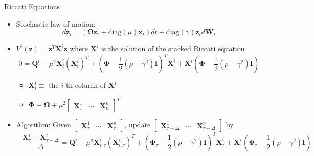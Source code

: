 \documentclass[
  10pt,               %
  aspectratio=169,     %
]{beamer}
\theoremstyle{plain}
\begin{document}
\begin{frame}{Riccati Equations}
  \begin{itemize}
    \item  Stochastic law of motion:
          \[d\bm{z}_{t}=\left(\bm{\Omega}\bm{z}_{t}+\mathrm{diag}\left(\mu\right)\bm{x}_{t}\right)dt+\mathrm{diag}\left(\gamma\right)\bm{z}_{t} d\bm{W}_{t}\]
    \item  \label{riccati} $V^{i}\left(\bm{z}\right)=\bm{z}^{T}\bm{X}^{i}\bm{z}$ where
          $\bm{X}^{i}$ is the solution of the stacked Riccati equation
            {\small
              \[
                0=\bm{Q}^{i}-\mu^{2}\bm{X}_{i}^{i}\left(\bm{X}_{i}^{i}\right)^{T}+\left(\bm{\Phi}-\frac{1}{2}\left(\rho-\gamma^{2}\right)\bm{I}\right)^{T}\bm{X}^{i}+\bm{X}^{i}\left(\bm{\Phi}-\frac{1}{2}\left(\rho-\gamma^{2}\right)\bm{I}\right)
              \]
            }
          \begin{itemize}
            \item $\bm{X}_{i}^{i}\equiv$ the $i$ th column of $\bm{X}^{i}$
            \item $\bm{\Phi}\equiv\bm{\Omega}+\mu^{2}\left[\begin{array}{ccc}
                        \bm{X}_{1}^{1} & \cdots & \bm{X}_{n}^{n}\end{array}\right]^{T}$
          \end{itemize} \medskip{}
    \item Algorithm: Given $\left[\begin{array}{ccc}
                \bm{X}_{\tau}^{1} & \cdots & \bm{X}_{\tau}^{n}\end{array}\right]$, update $\left[\begin{array}{ccc}
                \bm{X}_{\tau-\Delta}^{1} & \cdots & \bm{X}_{\tau-\Delta}^{n}\end{array}\right]$ by
            {\small
              \[
                -\frac{\bm{X}_{\tau}^{i}-\bm{X}_{\tau-\Delta}^{i}}{\Delta}=\bm{Q}^{i}-\mu^{2}\bm{X}_{i,\tau}^{i}\left(\bm{X}_{i,\tau}^{i}\right)^{T}+\left(\bm{\Phi}_{\tau}-\frac{1}{2}\left(\rho-\gamma^{2}\right)\bm{I}\right)^{T}\bm{X}_{\tau}^{i}+\bm{X}_{\tau}^{i}\left(\bm{\Phi}_{\tau}-\frac{1}{2}\left(\rho-\gamma^{2}\right)\bm{I}\right)
              \]}
  \end{itemize}
  \hyperlink{hjb}{}
\end{frame}
\end{document}
